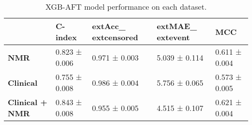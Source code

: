 \begin{table}
\caption{XGB-AFT model performance on each dataset.}
\label{tab:results_ex2}
\begin{tabular}{lllll}
\toprule
 & C-index & 	ext{Acc}_{	ext{censored}} & 	ext{MAE}_{	ext{event}} & MCC \\
\midrule
\textbf{NMR} & 0.823 ± 0.006 & 0.971 ±                 0.003 & 5.039 ± 0.114 & 0.611 ± 0.004 \\
\textbf{Clinical} & 0.755 ± 0.008 & 0.986 ±                 0.004 & 5.756 ± 0.065 & 0.573 ± 0.005 \\
\textbf{Clinical + NMR} & 0.843 ± 0.008 & 0.955 ±                 0.005 & 4.515 ± 0.107 & 0.621 ± 0.004 \\
\bottomrule
\end{tabular}
\end{table}

